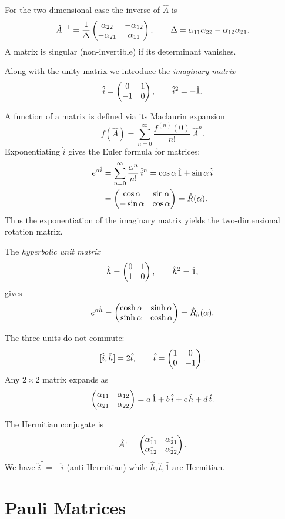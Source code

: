 For the two-dimensional case the inverse of $\hat{A}$ is
\[
\hat{A}^{-1} = \frac{1}{\Delta}\begin{pmatrix}\alpha_{22} & -\alpha_{12} \\ -\alpha_{21} & \alpha_{11}\end{pmatrix},\qquad
\Delta = \alpha_{11}\alpha_{22} - \alpha_{12}\alpha_{21}.
\]
A matrix is singular (non-invertible) if its determinant vanishes.

Along with the unity matrix we introduce the \emph{imaginary matrix}
\begin{equation}
\hat{i} = \begin{pmatrix}0 & 1 \\ -1 & 0\end{pmatrix},\qquad \hat{i}^{2} = -\hat{1}.
\label{eq:1.1.9}
\end{equation}

A function of a matrix is defined via its Maclaurin expansion
\[
f(\hat{A}) = \sum_{n=0}^{\infty}\frac{f^{(n)}(0)}{n!}\,\hat{A}^{n}.
\]
Exponentiating $\hat{i}$ gives the Euler formula for matrices:
\begin{align}
e^{\alpha\hat{i}}
&= \sum_{n=0}^{\infty}\frac{\alpha^{n}}{n!}\,\hat{i}^{n}
 = \cos\alpha\,\hat{1} + \sin\alpha\,\hat{i} \notag \\
&= \begin{pmatrix}\cos\alpha & \sin\alpha \\ -\sin\alpha & \cos\alpha\end{pmatrix}
 = \hat{R}(\alpha).
\label{eq:1.1.17}
\end{align}
Thus the exponentiation of the imaginary matrix yields the two-dimensional rotation matrix.

The \emph{hyperbolic unit matrix}
\[
\hat{h} = \begin{pmatrix}0 & 1 \\ 1 & 0\end{pmatrix},\qquad \hat{h}^{2} = \hat{1},
\]
gives
\[
e^{\alpha\hat{h}} = \begin{pmatrix}\cosh\alpha & \sinh\alpha \\ \sinh\alpha & \cosh\alpha\end{pmatrix}
= \hat{R}_{h}(\alpha).
\]

The three units do not commute:
\[
[\hat{i},\hat{h}] = 2\hat{t},\qquad
\hat{t} = \begin{pmatrix}1 & 0 \\ 0 & -1\end{pmatrix}.
\]
Any $2\times 2$ matrix expands as
\[
\begin{pmatrix}\alpha_{11} & \alpha_{12} \\ \alpha_{21} & \alpha_{22}\end{pmatrix}
= a\,\hat{1} + b\,\hat{i} + c\,\hat{h} + d\,\hat{t}.
\]

The Hermitian conjugate is
\[
\hat{A}^{\dagger} = \begin{pmatrix}\alpha_{11}^{*} & \alpha_{21}^{*} \\ \alpha_{12}^{*} & \alpha_{22}^{*}\end{pmatrix}.
\]
We have $\hat{i}^{\dagger} = -\hat{i}$ (anti-Hermitian) while $\hat{h},\hat{t},\hat{1}$ are Hermitian.

\section{Pauli Matrices}
\label{sec:1.2}

